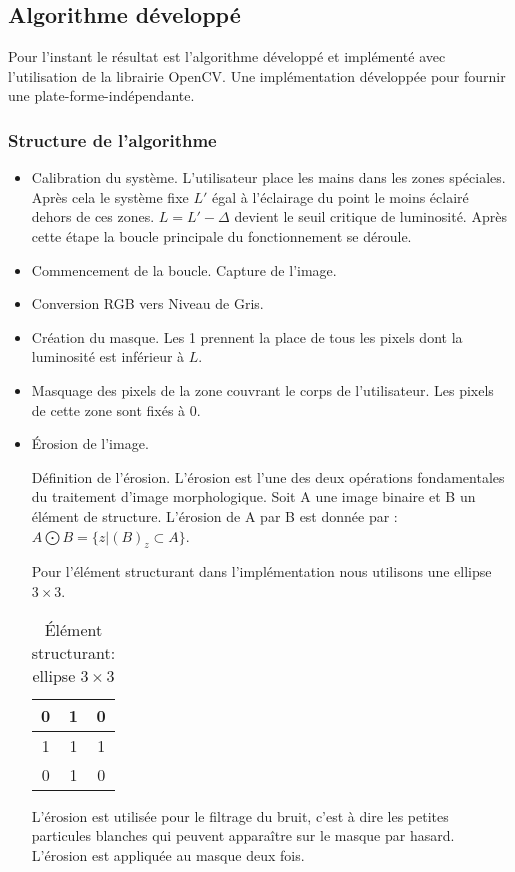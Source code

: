 \subsection*{Algorithme développé}
\par Pour l'instant le résultat est l'algorithme développé et implémenté avec l'utilisation de la librairie OpenCV. Une implémentation développée pour fournir une plate-forme-indépendante.
\subsubsection*{Structure de l'algorithme}
\begin{itemize}
\item Calibration du système. L'utilisateur place les mains dans les zones spéciales. Après cela le système fixe $L'$ égal à l'éclairage du point le moins éclairé dehors de ces zones. $L=L'-\Delta$ devient le seuil critique de luminosité. Après cette étape la boucle principale du fonctionnement se déroule.
\item Commencement de la boucle. Capture de l'image.
\item Conversion RGB vers Niveau de Gris. 
\item Création du masque. Les 1 prennent la place de tous les pixels dont la luminosité est inférieur à $L$.
\item Masquage des pixels de la zone couvrant le corps de l'utilisateur. Les pixels de cette zone sont fixés à 0.
\item Érosion de l'image. 
\par Définition de l'érosion. L'érosion est l'une des deux opérations fondamentales du traitement d'image morphologique. Soit A une image binaire et B un élément de structure. L'érosion de A par B est donnée par : $A \bigodot B = \{z|(B)_z \subset A\}$.
\par Pour l'élément structurant dans l'implémentation nous utilisons une ellipse $3 \times 3$.
\begin{table}[h]
\centering
\begin{tabular}{|c|c|c|}
\hline
0 & 1 & 0 \\ \hline
1 & 1 & 1 \\ \hline
0 & 1 & 0 \\ \hline
\end{tabular}
\caption{Élément structurant: ellipse $3 \times 3$}
\end{table}
\par L'érosion est utilisée pour le filtrage du bruit, c'est à dire les petites particules blanches qui peuvent apparaître sur le masque par hasard. L'érosion est appliquée au masque deux fois.

\end{itemize}
